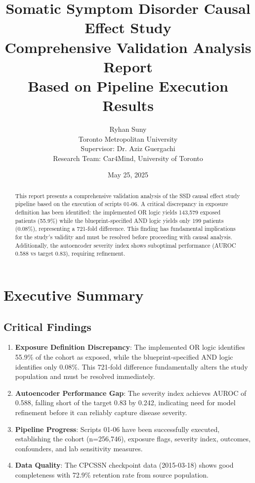 \documentclass[11pt]{article}
\title{Somatic Symptom Disorder Causal Effect Study\\
\large Comprehensive Validation Analysis Report\\
\normalsize Based on Pipeline Execution Results}
\author{Ryhan Suny\\
Toronto Metropolitan University\\
Supervisor: Dr. Aziz Guergachi\\
Research Team: Car4Mind, University of Toronto}
\date{May 25, 2025}
\begin{document}
\maketitle

\begin{abstract}
This report presents a comprehensive validation analysis of the SSD causal effect study pipeline based on the execution of scripts 01-06. A critical discrepancy in exposure definition has been identified: the implemented OR logic yields 143,579 exposed patients (55.9\%) while the blueprint-specified AND logic yields only 199 patients (0.08\%), representing a 721-fold difference. This finding has fundamental implications for the study's validity and must be resolved before proceeding with causal analysis. Additionally, the autoencoder severity index shows suboptimal performance (AUROC 0.588 vs target 0.83), requiring refinement.
\end{abstract}

\tableofcontents
\newpage

\section{Executive Summary}

\subsection{Critical Findings}

\begin{enumerate}
    \item \textcolor{alertred}{\textbf{Exposure Definition Discrepancy}}: The implemented OR logic identifies 55.9\% of the cohort as exposed, while the blueprint-specified AND logic identifies only 0.08\%. This 721-fold difference fundamentally alters the study population and must be resolved immediately.
    
    \item \textbf{Autoencoder Performance Gap}: The severity index achieves AUROC of 0.588, falling short of the target 0.83 by 0.242, indicating need for model refinement before it can reliably capture disease severity.
    
    \item \textbf{Pipeline Progress}: Scripts 01-06 have been successfully executed, establishing the cohort (n=256,746), exposure flags, severity index, outcomes, confounders, and lab sensitivity measures.
    
    \item \textbf{Data Quality}: The CPCSSN checkpoint data (2015-03-18) shows good completeness with 72.9\% retention rate from source population.
\end{enumerate}
\end{document}
